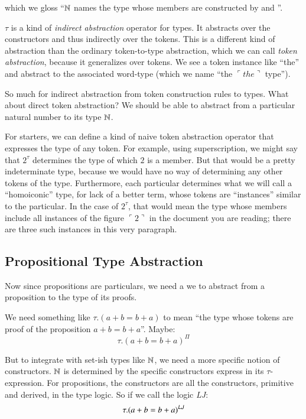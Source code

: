 \documentclass{article}
\begin{document}
which we gloss ``\(\mathbb{N}\) names the type whose members are constructed
by \ZNat and \SNat''.

\(\tau\) is a kind of \textit{indirect abstraction} operator for
types. It abstracts over the constructors and thus indirectly over the
tokens. This is a different kind of abstraction than the ordinary
token-to-type abstraction, which we can call \textit{token
  abstraction}, because it generalizes over tokens. We see a token
instance like ``the'' and abstract to the associated word-type (which
we name ``the \(\ulcorner the\urcorner\) type'').

So much for indirect abstraction from token construction rules to
types. What about direct token abstraction? We should be able to
abstract from a particular natural number to its type \(\mathbb{N}\).

For starters, we can define a kind of naive token abstraction operator
that expresses the type of any token. For example, using
superscription, we might say that \(2^{\tau}\) determines the type of
which \(2\) is a member. But that would be a pretty indeterminate
type, because we would have no way of determining any other tokens of
the type. Furthermore, each particular determines what we will call a
``homoiconic'' type, for lack of a better term, whose tokens are
``instances'' similar to the particular. In the case of \(2^{\tau}\),
that would mean the type whose members include all instances of the
figure \(\ulcorner 2\urcorner\) in the document you are reading; there
are three such instances in this very paragraph.

\subsection{Propositional Type Abstraction}

Now since propositions are particulars, we need a we to abstract from
a proposition to the type of its proofs.

We need something like \(\tau.(a+b=b+a)\) to mean ``the type whose tokens are proof of the proposition \(a+b=b+a\)''.  Maybe:
\[\tau.(a+b=b+a)^{\Pi}\]

But to integrate with set-ish types like \(\mathbb{N}\), we need a more
specific notion of constructors. \(\mathbb{N}\) is determined by the
specific constructors express in its \(\tau\)-expression. For
propositions, the constructors are all the constructors, primitive and
derived, in the type logic. So if we call the logic \textsf{\slshape LJ}:
\[\tau.(a+b=b+a)^{\textsf{\slshape LJ}}\]
\end{document}
